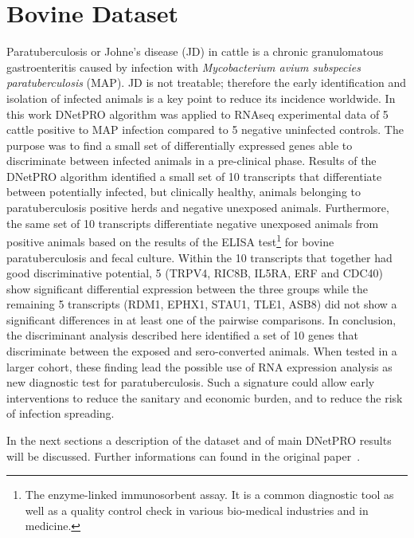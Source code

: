 \documentclass{standalone}
\begin{document}
\section[Bovine Dataset]{Bovine Dataset}\label{bovine:bovine}

Paratuberculosis or Johne's disease (JD) in cattle is a chronic granulomatous gastroenteritis caused by infection with \emph{Mycobacterium avium subspecies paratuberculosis} (MAP).
JD is not treatable; therefore the early identification and isolation of infected animals is a key point to reduce its incidence worldwide.
In this work DNetPRO algorithm was applied to RNAseq experimental data of 5 cattle positive to MAP infection compared to 5 negative uninfected controls.
The purpose was to find a small set of differentially expressed genes able to discriminate between infected animals in a pre-clinical phase.
Results of the DNetPRO algorithm identified a small set of 10 transcripts that differentiate between potentially infected, but clinically healthy, animals belonging to paratuberculosis positive herds and negative unexposed animals.
Furthermore, the same set of 10 transcripts differentiate negative unexposed animals from positive animals based on the results of the ELISA test\footnote{
  The enzyme-linked immunosorbent assay.
  It is a common diagnostic tool as well as a quality control check in various bio-medical industries and in medicine.
} for bovine paratuberculosis and fecal culture.
Within the 10 transcripts that together had good discriminative potential, 5 (TRPV4, RIC8B, IL5RA, ERF and CDC40) show significant differential expression between the three groups while the remaining 5 transcripts (RDM1, EPHX1, STAU1, TLE1, ASB8) did not show a significant differences in at least one of the pairwise comparisons.
In conclusion, the discriminant analysis described here identified a set of 10 genes that discriminate between the exposed and sero-converted animals.
When tested in a larger cohort, these finding lead the possible use of RNA expression analysis as new diagnostic test for paratuberculosis.
Such a signature could allow early interventions to reduce the sanitary and economic burden, and to reduce the risk of infection spreading.

In the next sections a description of the dataset and of main DNetPRO results will be discussed.
Further informations can found in the original paper~\cite{Malvisi2019}.
\end{document}
